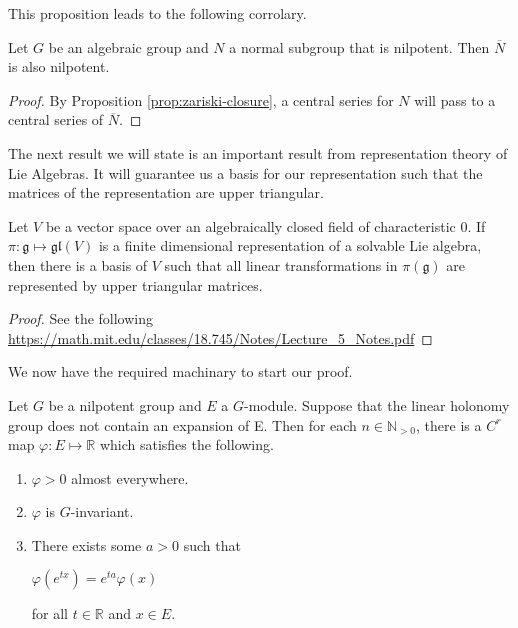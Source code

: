 This proposition leads to the following corrolary.
\begin{corollary}\label{corr:closure-nilpotent}
    Let $G$ be an algebraic group and $N$ a normal subgroup that is nilpotent. Then $\overline{N}$ is also nilpotent.
\end{corollary}

\begin{proof}
    By Proposition \ref{prop:zariski-closure}, a central series for $N$ will pass to a central series of $\overline{N}$.
\end{proof}

The next result we will state is an important result from representation theory
of Lie Algebras. It will guarantee us a basis for our representation such that
the matrices of the representation are upper triangular.

\begin{theorem}
    Let $V$ be a vector space over an algebraically closed field of characteristic $0$. If $\pi : \mathfrak{g} \mapsto \mathfrak{gl}(V)$
    is a finite dimensional representation of a solvable Lie algebra, then there is a basis of $V$ such that all linear transformations in
    $\pi(\mathfrak{g})$ are represented by upper triangular matrices.
\end{theorem}
\begin{proof}
    See the following \url{https://math.mit.edu/classes/18.745/Notes/Lecture_5_Notes.pdf}
\end{proof}

We now have the required machinary to start our proof.

\begin{lemma}
    Let $G$ be a nilpotent group and $E$ a $G$-module. Suppose that the linear holonomy group does not
    contain an expansion of E. Then for each $n \in \mathbb{N}_{>0}$, there is a $C^r$ map $\varphi : E \mapsto \mathbb{R}$
    which satisfies the following.
    \begin{enumerate}
        \item $\varphi > 0$ almost everywhere.
        \item $\varphi$ is $G$-invariant.
        \item There exists some $a>0$ such that
              \begin{center}
                  $\varphi(e^{tx}) = e^{ta}\varphi(x)$
              \end{center}
              for all $t \in \mathbb{R}$ and $x \in E$.
    \end{enumerate}
\end{lemma}

